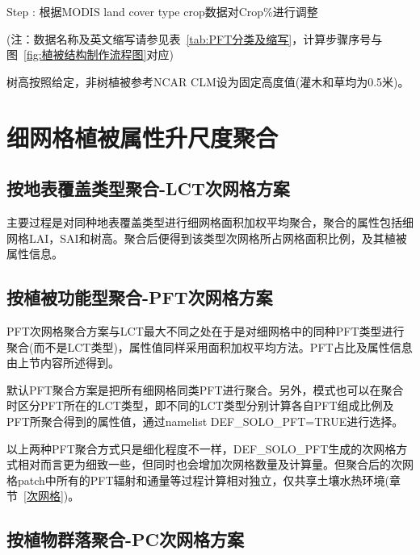 Step : 根据MODIS land cover type crop数据对Crop\%进行调整

(注：数据名称及英文缩写请参见表~\ref{tab:PFT分类及缩写}，计算步骤序号与图~\ref{fig:植被结构制作流程图}对应)

树高按照\citet{simard2011mapping}给定，非树植被参考NCAR CLM设为固定高度值(灌木和草均为0.5米)。

\section{细网格植被属性升尺度聚合}
\subsection{按地表覆盖类型聚合-LCT次网格方案}

主要过程是对同种地表覆盖类型进行细网格面积加权平均聚合，聚合的属性包括细网格LAI，SAI和树高。聚合后便得到该类型次网格所占网格面积比例，及其植被属性信息。

\subsection{按植被功能型聚合-PFT次网格方案}

PFT次网格聚合方案与LCT最大不同之处在于是对细网格中的同种PFT类型进行聚合(而不是LCT类型)，属性值同样采用面积加权平均方法。PFT占比及属性信息由上节内容所述得到。

默认PFT聚合方案是把所有细网格同类PFT进行聚合。另外，模式也可以在聚合时区分PFT所在的LCT类型，即不同的LCT类型分别计算各自PFT组成比例及PFT所聚合得到的属性值，通过namelist DEF\_SOLO\_PFT=TRUE进行选择。

以上两种PFT聚合方式只是细化程度不一样，DEF\_SOLO\_PFT生成的次网格方式相对而言更为细致一些，但同时也会增加次网格数量及计算量。但聚合后的次网格patch中所有的PFT辐射和通量等过程计算相对独立，仅共享土壤水热环境(章节~\ref{次网格})。 

\subsection{按植物群落聚合-PC次网格方案}

